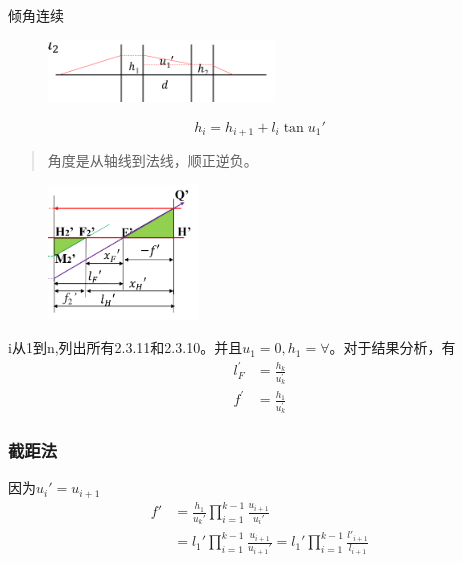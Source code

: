 倾角连续
        \begin{figure}[H]
            \centering
            \includegraphics[width=6cm]{img/3.18.png}
            \end{figure}
\begin{equation}
h_i=h_{i+1}+l_i \tan u_1' \tag{2.3.14}
\end{equation}
\begin{quote}
{\qquad{}\ccwd\kaishu{}
角度是从轴线到法线，顺正逆负。
}
\end{quote}
\begin{figure}[H]
    \centering
    \includegraphics[width=4cm]{img/3.19.png}
    \end{figure}
i从1到n,列出所有2.3.11和2.3.10。并且$u_1=0,h_1=\forall $。对于结果分析，有
\begin{align}
      l _ { F } ^ { \prime } &= \frac { h _ { k } } { u _ { k } ^ { \prime } }  \tag{2.3.15.a}\\
    f ^ { \prime } &= \frac { h _ { 1 } } { u _ { k } ^ { \prime } }   \tag{2.3.15.b}
\end{align}
\subsubsection{截距法}
因为$u_{i}'=u_{i+1}$
\begin{equation}
\begin{aligned}
    f'&=\frac{h_1}{u_k'}\prod_{i=1}^{k-1}\frac{u_{i+1}}{u_{i}'} \\
    &=l_1' \prod_{i=1}^{k-1}\frac{u_{i+1}}{u_{i+1}'}=l_1' \prod_{i=1}^{k-1}\frac{l'_{i+1}}{l_{i+1}}\\
\end{aligned} \tag{2.3.16}
\end{equation}
